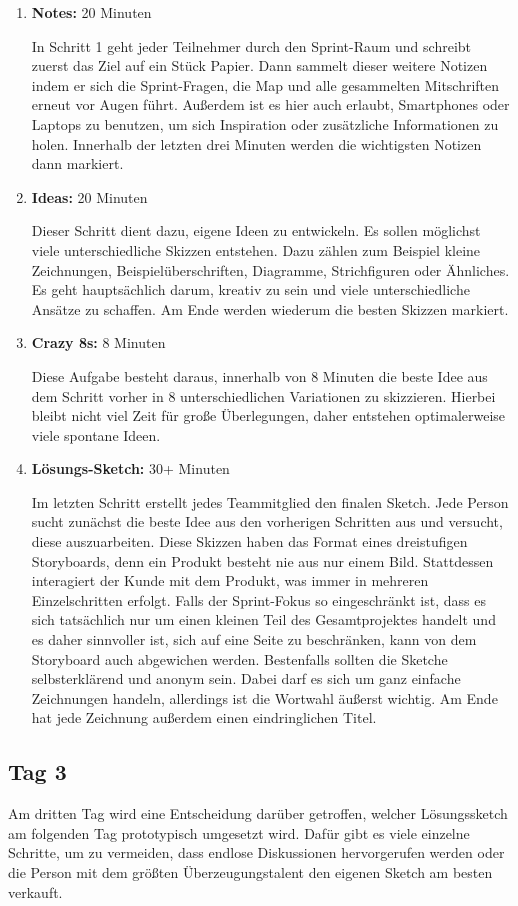 \begin{enumerate}
	\item \textbf{Notes:} 20 Minuten
	
	In Schritt 1 geht jeder Teilnehmer durch den Sprint-Raum und schreibt zuerst das Ziel auf ein Stück Papier. Dann sammelt dieser weitere Notizen indem er sich die Sprint-Fragen, die Map und alle gesammelten Mitschriften erneut vor Augen führt. Außerdem ist es hier auch erlaubt, Smartphones oder Laptops zu benutzen, um sich Inspiration oder zusätzliche Informationen zu holen. Innerhalb der letzten drei Minuten werden die wichtigsten Notizen dann markiert.
	\item \textbf{Ideas:} 20 Minuten
	
	Dieser Schritt dient dazu, eigene Ideen zu entwickeln. Es sollen möglichst viele unterschiedliche Skizzen entstehen. Dazu zählen zum Beispiel kleine Zeichnungen, Beispielüberschriften, Diagramme, Strichfiguren oder Ähnliches. Es geht hauptsächlich darum, kreativ zu sein und viele unterschiedliche Ansätze zu schaffen. Am Ende werden wiederum die besten Skizzen markiert.
	\item \textbf{Crazy 8s:} 8 Minuten
	
	Diese Aufgabe 	besteht daraus, innerhalb von 8 Minuten die beste Idee aus dem Schritt vorher in 8 unterschiedlichen Variationen zu skizzieren. Hierbei bleibt nicht viel Zeit für große Überlegungen, daher entstehen optimalerweise viele spontane Ideen.
	\item \textbf{Lösungs-Sketch:} 30+ Minuten
	
	Im letzten Schritt erstellt jedes Teammitglied den finalen Sketch. Jede Person sucht zunächst die beste Idee aus den vorherigen Schritten aus und versucht, diese auszuarbeiten. Diese Skizzen haben das Format eines dreistufigen Storyboards, denn ein Produkt besteht nie aus nur einem Bild. Stattdessen interagiert der Kunde mit dem Produkt, was immer in mehreren Einzelschritten erfolgt. Falls der Sprint-Fokus so eingeschränkt ist, dass es sich tatsächlich nur um einen kleinen Teil des Gesamtprojektes handelt und es daher sinnvoller ist, sich auf eine Seite zu beschränken, kann von dem Storyboard auch abgewichen werden. Bestenfalls sollten die Sketche selbsterklärend und anonym sein. Dabei darf es sich um ganz einfache Zeichnungen handeln, allerdings ist die Wortwahl äußerst wichtig. Am Ende hat jede Zeichnung außerdem einen eindringlichen Titel.
\end{enumerate}

\subsection*{\label{sec:Sprint-Tag3}\thesubsection\quad Tag 3}
Am dritten Tag wird eine Entscheidung darüber getroffen, welcher Lösungssketch am folgenden Tag prototypisch umgesetzt wird. Dafür gibt es viele einzelne Schritte, um zu vermeiden, dass endlose Diskussionen hervorgerufen werden oder die Person mit dem größten Überzeugungstalent den eigenen Sketch am besten verkauft.

